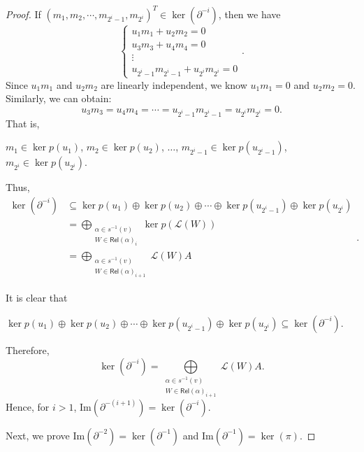 \documentclass[10pt,a4paper]{amsart}
\begin{document}
\begin{proof}
	If \( (m_1, m_2, \cdots, m_{2^i - 1}, m_{2^i})^T \in \ker (\partial^{-i}) \), then we have
	\[
	\begin{cases}
		u_1 m_1 + u_2 m_2 = 0 \\
		u_3 m_3 + u_4 m_4 = 0 \\
		\vdots \\
		u_{2^i - 1} m_{2^i - 1} + u_{2^i} m_{2^i} = 0
	\end{cases}.
	\]
	Since \( u_1 m_1 \) and \( u_2 m_2 \) are linearly independent, we know \( u_1 m_1 = 0 \) and \( u_2 m_2 = 0 \). Similarly, we can obtain:
	\[
	u_3 m_3 = u_4 m_4 = \cdots = u_{2^i - 1} m_{2^i - 1} = u_{2^i} m_{2^i} = 0.
	\]
	That is, 
	\begin{center}
		\( m_1 \in \ker p(u_1) \), \( m_2 \in \ker p(u_2) \), \(\ldots\), \( m_{2^i - 1} \in \ker p(u_{2^i - 1}) \), \( m_{2^i} \in \ker p(u_{2^i}) \).
	\end{center} 
	Thus,
   \[
	\begin{aligned}
		\ker(\partial^{-i})  &\subseteq \ker p(u_1) \oplus \ker p(u_2) \oplus \cdots \oplus \ker p(u_{2^i - 1}) \oplus \ker p(u_{2^i}) \\
		&= \bigoplus\limits_{\substack{\alpha \in s^{-1}(v) \\ W \in \mathsf{Rel}(\alpha)_i}} \ker p(\mathscr{L}(W))\\ 
		& = \bigoplus\limits_{\substack{\alpha \in s^{-1}(v) \\ W \in \mathsf{Rel}(\alpha)_{i + 1}}} \mathscr{L}(W)A
	\end{aligned}.
	\]
	
	It is clear that 
\begin{center}
	\( \ker p(u_1) \oplus \ker p(u_2) \oplus \cdots \oplus \ker p(u_{2^i - 1}) \oplus \ker p(u_{2^i}) \subseteq \ker(\partial^{-i})  \). 
\end{center}
Therefore, 
     \[
		\ker(\partial^{-i}) = \bigoplus\limits_{\substack{\alpha \in s^{-1}(v) \\ W \in \mathsf{Rel}(\alpha)_{i + 1}}} \mathscr{L}(W)A. 
\] 
	Hence, for \( i > 1 \), \( \text{Im}(\partial^{-(i + 1)}) = \ker(\partial^{-i}) \).
	
	Next, we prove 
	\( \text{Im}(\partial^{-2}) = \ker(\partial^{-1}) \) and \( \text{Im}(\partial^{-1}) = \ker(\pi) \).
	

\end{proof}
\end{document}
